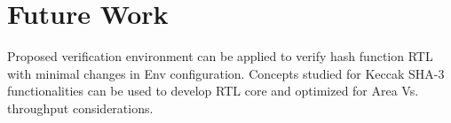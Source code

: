 \chapter*{Future Work}
	Proposed verification environment can be applied to verify hash function RTL with minimal changes in Env configuration. Concepts studied for Keccak SHA-3 functionalities can be used to develop RTL core and optimized for Area Vs. throughput considerations.